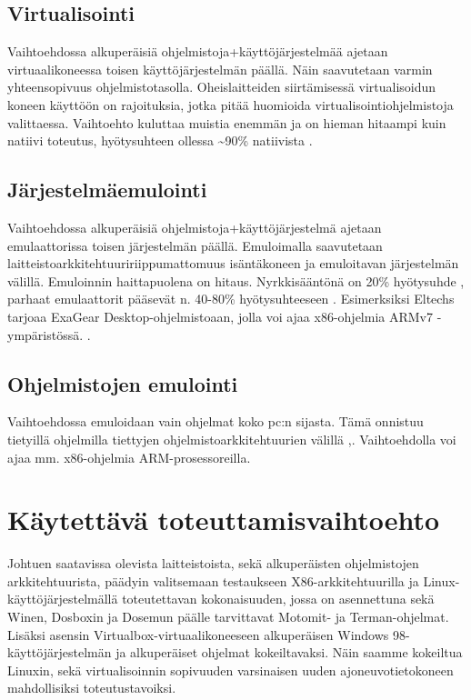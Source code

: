 \documentclass[11pt,a4paper,oneside,article]{memoir}
\begin{document}
\subsection{Virtualisointi}

Vaihtoehdossa alkuperäisiä ohjelmistoja+käyttöjärjestelmää ajetaan virtuaalikoneessa toisen käyttöjärjestelmän päällä. Näin saavutetaan varmin yhteensopivuus ohjelmistotasolla. Oheislaitteiden siirtämisessä virtualisoidun koneen käyttöön on rajoituksia, jotka pitää huomioida virtualisointiohjelmistoja valittaessa. Vaihtoehto kuluttaa muistia enemmän ja on hieman hitaampi kuin natiivi toteutus, hyötysuhteen ollessa \textasciitilde{}90\%  natiivista \cite{virtnat_anadtech}.

\subsection{Järjestelmäemulointi}

Vaihtoehdossa alkuperäisiä ohjelmistoja+käyttöjärjestelmä ajetaan emulaattorissa toisen järjestelmän päällä. Emuloimalla saavutetaan laitteistoarkkitehtuuririippumattomuus isäntäkoneen ja emuloitavan järjestelmän välillä. Emuloinnin haittapuolena on hitaus. Nyrkkisääntönä on 20\% hyötysuhde \cite{tinycc}, parhaat emulaattorit pääsevät n. 40-80\% hyötysuhteeseen \cite{40pperf}. Esimerksiksi Eltechs tarjoaa ExaGear Desktop-ohjelmistoaan, jolla voi ajaa x86-ohjelmia ARMv7 -ympäristössä. \cite{eltechs:exagear}. 

\subsection{Ohjelmistojen emulointi}

Vaihtoehdossa emuloidaan vain ohjelmat koko pc:n sijasta. Tämä onnistuu tietyillä ohjelmilla tiettyjen ohjelmistoarkkitehtuurien välillä \cite{tinycc},\cite{qemu_use}. Vaihtoehdolla voi ajaa mm. x86-ohjelmia ARM-prosessoreilla.

\section{Käytettävä toteuttamisvaihtoehto}

Johtuen saatavissa olevista laitteistoista, sekä alkuperäisten ohjelmistojen arkkitehtuurista, päädyin valitsemaan testaukseen X86-arkkitehtuurilla ja Linux-käyttöjärjestelmällä toteutettavan kokonaisuuden, jossa on asennettuna sekä Winen, Dosboxin ja Dosemun päälle tarvittavat Motomit- ja Terman-ohjelmat. Lisäksi asensin Virtualbox-virtuaalikoneeseen alkuperäisen Windows 98-käyttöjärjestelmän ja alkuperäiset ohjelmat kokeiltavaksi. Näin saamme kokeiltua Linuxin, sekä virtualisoinnin sopivuuden varsinaisen uuden ajoneuvotietokoneen mahdollisiksi toteutustavoiksi.
\end{document}
